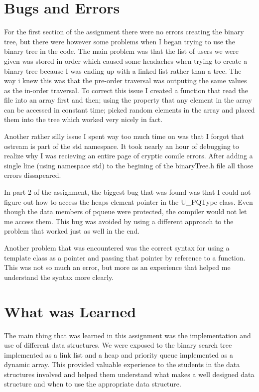 \documentclass[pdftex, 12pt]{article}
\begin{document}
\section{Bugs and Errors}

For the first section of the assignment there were no errors creating the binary tree, but there were however some
problems when I began trying to use the binary tree in the code.  The main problem was that the list of users we were
given was stored in order which caused some headaches when trying to create a binary tree because I was ending up with a
linked list rather than a tree.  The way i knew this was that the pre-order traversal was outputing the same values as
the in-order traversal.  To correct this issue I created a function that read the file into an array first and then;
using the property that any element in the array can be accessed in constant time; picked random elements in the array
and placed them into the tree which worked very nicely in fact.

Another rather silly issue I spent way too much time on was that I forgot that ostream is part of the std namespace. It
took nearly an hour of debugging to realize why I was recieving an entire page of cryptic comile errors.  After adding a
single line (using namespace std) to the begining of the binaryTree.h file all those errors dissapeared.

In part 2 of the assignment, the biggest bug that was found was that I could not figure out how to access the heaps
element pointer in the U\_PQType class. Even though the data members of pqueue were protected, the compiler would not
let me access them. This bug was avoided by using a different approach to the problem that worked just as well in the
end. 

Another problem that was encountered was the correct syntax for using a template class as a pointer and passing that
pointer by reference to a function. This was not so much an error, but more as an experience that helped me understand
the syntax more clearly. 

\section{What was Learned}

The main thing that was learned in this assignment was the implementation and use of different data structures. We were
exposed to the binary search tree implemented as a link list and a heap and priority queue implemented as a dynamic
array. This provided valuable experience to the students in the data structures involved and helped them understand what
makes a well designed data structure and when to use the appropriate data structure. 
\end{document}
